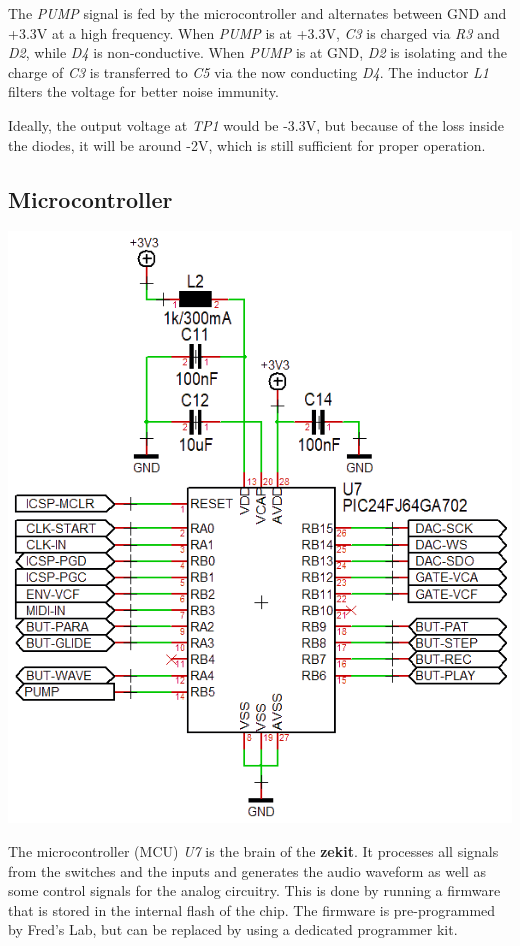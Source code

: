 \documentclass{scrartcl}
\begin{document}
The \emph{PUMP} signal is fed by the microcontroller and alternates between GND and +3.3V at a high frequency. When \emph{PUMP} is at +3.3V, \emph{C3} is charged via \emph{R3} and \emph{D2}, while \emph{D4} is non-conductive. When \emph{PUMP} is at GND, \emph{D2} is isolating and the charge of \emph{C3} is transferred to \emph{C5} via the now conducting \emph{D4}. The inductor \emph{L1} filters the voltage for better noise immunity.

Ideally, the output voltage at \emph{TP1} would be -3.3V, but because of the loss inside the diodes, it will be around -2V, which is still sufficient for proper operation.

\subsection{Microcontroller}

\begin{center}
    \includegraphics[scale=0.55]{assets/schema-mcu.png}
\end{center}

The microcontroller (MCU) \emph{U7} is the brain of the \textbf{zekit}. It processes all signals from the switches and the inputs and generates the audio waveform as well as some control signals for the analog circuitry. This is done by running a firmware that is stored in the internal flash of the chip. The firmware is pre-programmed by Fred's Lab, but can be replaced by using a dedicated programmer kit.
\end{document}
